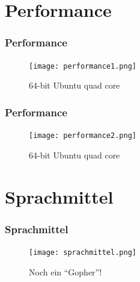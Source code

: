 \documentclass{beamer}
\begin{document}

\section{Performance}
\begin{frame}
\frametitle{Performance}

\centering
\begin{figure}
\texttt{[image: performance1.png]}
\caption{64-bit Ubuntu quad core}
\end{figure}

\end{frame}

\begin{frame}
\frametitle{Performance}

\centering
\begin{figure}
\texttt{[image: performance2.png]}
\caption{64-bit Ubuntu quad core}
\end{figure}

\end{frame}


\section{Sprachmittel}
\begin{frame}
\frametitle{Sprachmittel}

\centering
\begin{figure}
\texttt{[image: sprachmittel.png]}
\caption{Noch ein ``Gopher''!}
\end{figure}

\end{frame}

\end{document}

